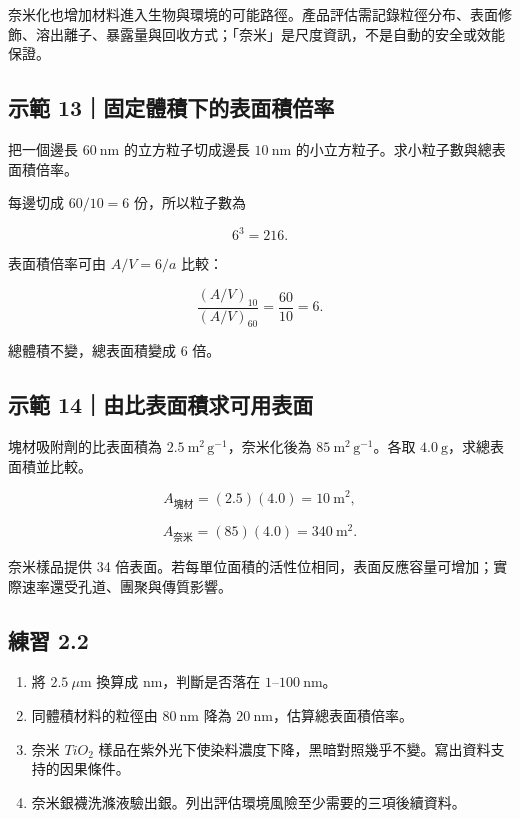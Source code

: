 \documentclass[11pt,a4paper]{article}
\providecommand{\tightlist}{%
  \setlength{\itemsep}{0pt}\setlength{\parskip}{0pt}}
\begin{document}
奈米化也增加材料進入生物與環境的可能路徑。產品評估需記錄粒徑分布、表面修飾、溶出離子、暴露量與回收方式；「奈米」是尺度資訊，不是自動的安全或效能保證。

\begin{HandoutWorkedExample}

\subsection{示範 13｜固定體積下的表面積倍率}\label{ux793aux7bc4-13ux56faux5b9aux9ad4ux7a4dux4e0bux7684ux8868ux9762ux7a4dux500dux7387}

把一個邊長 \(60\ \mathrm{nm}\) 的立方粒子切成邊長 \(10\ \mathrm{nm}\) 的小立方粒子。求小粒子數與總表面積倍率。

每邊切成 \(60/10=6\) 份，所以粒子數為

\[
6^3=216.
\]

表面積倍率可由 \(A/V=6/a\) 比較：

\[
\frac{(A/V)_{10}}{(A/V)_{60}}=\frac{60}{10}=6.
\]

總體積不變，總表面積變成 6 倍。

\end{HandoutWorkedExample}

\begin{HandoutWorkedExample}

\subsection{示範 14｜由比表面積求可用表面}\label{ux793aux7bc4-14ux7531ux6bd4ux8868ux9762ux7a4dux6c42ux53efux7528ux8868ux9762}

塊材吸附劑的比表面積為 \(2.5\ \mathrm{m^2\,g^{-1}}\)，奈米化後為 \(85\ \mathrm{m^2\,g^{-1}}\)。各取 \(4.0\ \mathrm g\)，求總表面積並比較。

\[
A_{\text{塊材}}=(2.5)(4.0)=10\ \mathrm{m^2},
\]

\[
A_{\text{奈米}}=(85)(4.0)=340\ \mathrm{m^2}.
\]

奈米樣品提供 34 倍表面。若每單位面積的活性位相同，表面反應容量可增加；實際速率還受孔道、團聚與傳質影響。

\end{HandoutWorkedExample}

\subsection{練習 2.2}\label{ux7df4ux7fd2-2.2}

\begin{enumerate}
\def\labelenumi{\arabic{enumi}.}
\tightlist
\item
  將 \(2.5\ \mu\mathrm m\) 換算成 nm，判斷是否落在 \(1\)--\(100\ \mathrm{nm}\)。
\item
  同體積材料的粒徑由 \(80\ \mathrm{nm}\) 降為 \(20\ \mathrm{nm}\)，估算總表面積倍率。
\item
  奈米 \(TiO_2\) 樣品在紫外光下使染料濃度下降，黑暗對照幾乎不變。寫出資料支持的因果條件。
\item
  奈米銀襪洗滌液驗出銀。列出評估環境風險至少需要的三項後續資料。
\end{enumerate}
\end{document}
